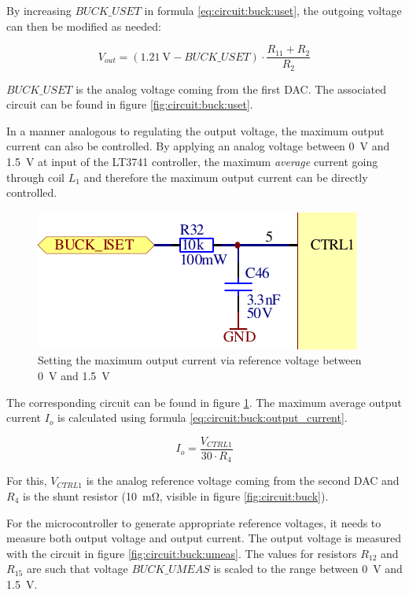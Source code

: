 By increasing $BUCK\_USET$ in formula \ref{eq:circuit:buck:uset}, the outgoing
voltage can then be modified as needed:

\begin{equation}
    V_{out} = (\SI{1.21}{\volt} - BUCK\_USET) \cdot \frac{R_{11} + R_2}{R_2}
    \label{eq:circuit:buck:uset}
\end{equation}

$BUCK\_USET$ is the  analog voltage coming from the  first DAC. The associated
circuit can be found in figure \ref{fig:circuit:buck:uset}.

In a  manner analogous to  regulating the  output voltage, the  maximum output
current  can  also be  controlled.   By  applying  an analog  voltage  between
\SI{0}{\volt}  and  \SI{1.5}{\volt}  at   input    of  the  LT3741
controller, the  maximum \emph{average} current  going through coil  $L_1$ and
therefore the maximum output current can be directly controlled.

\begin{figure}[th!]
    \center
    \includegraphics[width=.4\textwidth]{images/circuit/buck-iset.pdf}
    \caption{Setting the maximum output current via reference voltage between \SI{0}{\volt} and \SI{1.5}{\volt}}
    \label{fig:circuit:buck:iset}
\end{figure}

The corresponding circuit can be  found in figure \ref{fig:circuit:buck:iset}.
The maximum  average   output  current  $I_o$  is   calculated  using  formula
\ref{eq:circuit:buck:output_current}.

\begin{equation}
    I_o = \frac{V_{CTRL1}}{30 \cdot R_4}
    \label{eq:circuit:buck:output_current}
\end{equation}

For this, $V_{CTRL1}$  is the analog reference voltage coming  from the second
DAC and  $R_4$ is the  shunt resistor (\SI{10}{\milli\ohm}, visible  in figure
\ref{fig:circuit:buck}).

For the microcontroller  to generate appropriate reference  voltages, it needs
to  measure both  output voltage  and  output current. The  output voltage  is
measured with  the circuit in figure  \ref{fig:circuit:buck:umeas}. The values
for resistors  $R_{12}$ and  $R_{15}$ are such  that voltage  $BUCK\_UMEAS$ is
scaled to the range between \SI{0}{\volt} and \SI{1.5}{\volt}.


